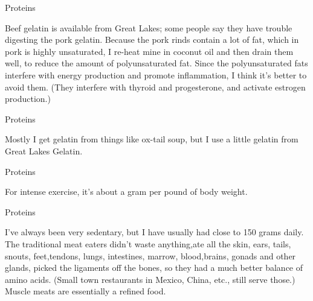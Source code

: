 \documentclass[11pt,oneside,openany,extrafontsizes]{memoir}
\begin{document}
\begin{standalonequote}{Proteins}

    \begin{answer}
        Beef gelatin is available from Great Lakes; some people say they have trouble digesting the pork gelatin. Because the pork rinds contain a lot of fat, which in pork is highly unsaturated, I re-heat mine in coconut oil and then drain them well, to reduce the amount of polyunsaturated fat. Since the polyunsaturated fats interfere with energy production and promote inflammation, I think it's better to avoid them. (They interfere with thyroid and progesterone, and activate estrogen production.)
    \end{answer}
\end{standalonequote}

\begin{standalonequote}{Proteins}

    \begin{answer}
        Mostly I get gelatin from things like ox-tail soup, but I use a little gelatin from Great Lakes Gelatin.
    \end{answer}
\end{standalonequote}

\begin{standalonequote}{Proteins}

    \begin{answer}
        For intense exercise, it's about a gram per pound of body weight.
    \end{answer}
\end{standalonequote}

\begin{standalonequote}{Proteins}

    \begin{answer}
        I've always been very sedentary, but I have usually had close to 150 grams daily. The traditional meat eaters didn't waste anything,ate all the skin, ears, tails, snouts, feet,tendons, lungs, intestines, marrow, blood,brains, gonads and other glands, picked the ligaments off the bones, so they had a much better balance of amino acids. (Small town restaurants in Mexico, China, etc., still serve those.) Muscle meats are essentially a refined food.
    \end{answer}
\end{standalonequote}
\end{document}
